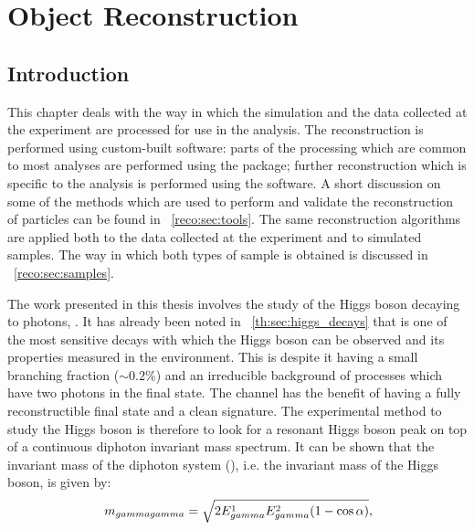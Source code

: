 \chapter{Object Reconstruction}
\label{chap:reconstruction}


\section{Introduction}
\label{reco:sec:intro}

This chapter deals with the way in which the simulation and the data collected at the \CMS experiment are processed for use in the \Hgg analysis. The reconstruction is performed using custom-built software: parts of the processing which are common to most \CMS analyses are performed using the \CMSSW package; further reconstruction which is specific to the \Hgg analysis is performed using the \FLASHgg software. %
A short discussion on some of the methods which are used to perform and validate the reconstruction of particles can be found in \Sec~\ref{reco:sec:tools}. 
The same reconstruction algorithms are applied both to the data collected at the \CMS experiment and to simulated samples. %
The way in which both types of sample is obtained is discussed in \Sec~\ref{reco:sec:samples}.

The work presented in this thesis involves the study of the Higgs boson decaying to photons, \Hgg. It has already been noted in \Sec~\ref{th:sec:higgs_decays} that \Hgg is one of the most sensitive decays with which the Higgs boson can be observed and its properties measured in the \LHC environment. This is despite it having a small branching fraction ($\sim 0.2\% $) and an irreducible \SM background of \QCD processes which have two photons in the final state. The channel has the benefit of having a fully reconstructible final state and a clean signature. The experimental method to study the Higgs boson is therefore to look for a resonant Higgs boson peak on top of a continuous diphoton invariant mass spectrum.
It can be shown that the invariant mass of the diphoton system (\mgg), i.e. the invariant mass of the Higgs boson, is given by:
\begin{equation}
\label{reco:eq:mgg}
 \,m_{gammagamma} = \sqrt{2 E_{gamma}^1 E_{gamma}^2 (1-\cos\alpha)}, 
\end{equation}


